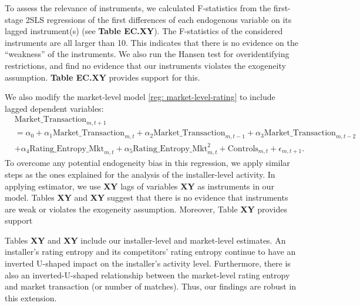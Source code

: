 \documentclass[msom,blindrev]{informs3}
\begin{document}
To assess the relevance of instruments, we calculated F-statistics from the first-stage 2SLS regressions of the first differences of each endogenous variable on its lagged instrument(s) (see \textbf{Table EC.XY}). The F-statistics of the considered
instruments are all larger than 10. This indicates that there is no evidence on the ``weakness'' of the instruments. We also run the Hansen test for overidentifying restrictions, and find no evidence that our instruments violates the exogeneity assumption. \textbf{Table EC.XY} provides support for this.

We also modify the market-level model \eqref{reg: market-level-rating} to include lagged dependent variables:
\begin{align} \nonumber
&\text{Market\_Transaction}_{m,t+1}\\ \nonumber
& =\alpha_{0}+ \alpha_{1} \text{Market\_Transaction}_{m,t}+ \alpha_{2} \text{Market\_Transaction}_{m,t-1} + \alpha_{3} \text{Market\_Transaction}_{m,t-2} \\ \label{eq: ext_market_level}
&+ \alpha_{4} \text{Rating\_Entropy\_Mkt}_{m,t}+ \alpha_{5}\text{Rating\_Entropy\_Mkt}_{m,t} ^2 + \text{Controls}_{m,t}  +\epsilon_{m,t+1}.
\end{align}
To overcome any potential endogeneity bias in this regression, we apply similar steps as the ones explained for the analysis of the installer-level activity. In applying  \cite{arellano1991some} estimator, we use \textbf{XY} lags of variables \textbf{XY} as instruments in our model. Tables \textbf{XY} and \textbf{XY} suggest that there is no evidence that instruments are weak or violates the exogeneity assumption. Moreover, Table \textbf{XY} provides support


Tables \textbf{XY} and \textbf{XY} include our installer-level and market-level estimates. An installer's rating entropy and its competitors' rating entropy continue to have an inverted U-shaped impact on the installer's activity level. Furthermore, there is also an inverted-U-shaped relationship between the market-level rating entropy and market transaction (or number of matches).  Thus, our findings are robust in this extension.



\end{document}
